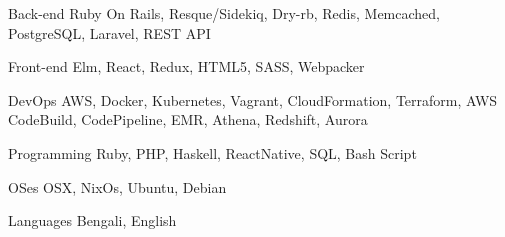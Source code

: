 

\begin{cvskills}

  \cvskill
    {Back-end} %
    {Ruby On Rails, Resque/Sidekiq, Dry-rb, Redis, Memcached, PostgreSQL, Laravel, REST API} %

  \cvskill
    {Front-end} %
    {Elm, React, Redux, HTML5, SASS, Webpacker} %

  \cvskill
    {DevOps} %
    {AWS, Docker, Kubernetes, Vagrant, CloudFormation, Terraform, AWS CodeBuild, CodePipeline, EMR, Athena, Redshift, Aurora} %

  \cvskill
    {Programming} %
    {Ruby, PHP, Haskell, ReactNative, SQL, Bash Script} %

  \cvskill
    {OSes} %
    {OSX, NixOs, Ubuntu, Debian} %

  \cvskill
    {Languages} %
    {Bengali, English} %

\end{cvskills}
